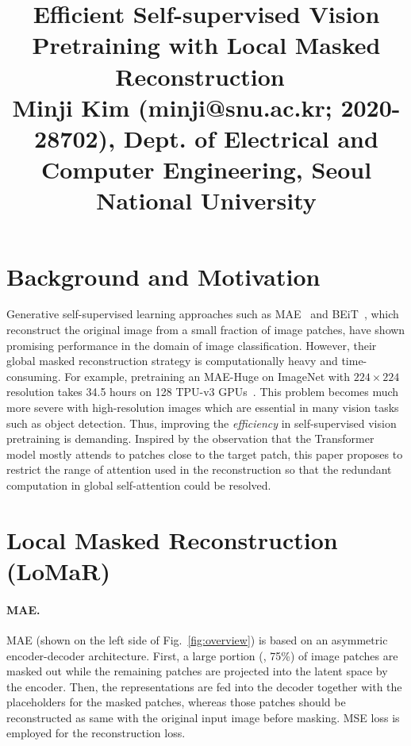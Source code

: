 \documentclass[10pt,twocolumn,letterpaper]{article}
\begin{document}
\title{Efficient Self-supervised Vision Pretraining with Local Masked Reconstruction~\cite{lomar} \\ {\rm {\normalsize Minji Kim (minji@snu.ac.kr; 2020-28702), Dept. of Electrical and Computer Engineering, Seoul National University}}}   %

\maketitle
\thispagestyle{empty}


\section{Background and Motivation}
Generative self-supervised learning approaches such as MAE~\cite{mae} and BEiT~\cite{beit}, which reconstruct the original image from a small fraction of image patches, have shown promising performance in the domain of image classification.
However, their global masked reconstruction strategy is computationally heavy and time-consuming.
For example, pretraining an MAE-Huge on ImageNet with $224 \times 224$ resolution takes 34.5 hours on 128 TPU-v3 GPUs~\cite{mae}.
This problem becomes much more severe with high-resolution images which are essential in many vision tasks such as object detection.
Thus, improving the \textit{efficiency} in self-supervised vision pretraining is demanding.
Inspired by the observation that the Transformer model mostly attends to patches close to the target patch, this paper proposes to restrict the range of attention used in the reconstruction so that the redundant computation in global self-attention could be resolved.


\section{Local Masked Reconstruction (LoMaR)}

\paragraph{MAE.}
MAE (shown on the left side of Fig.~\ref{fig:overview}) is based on an asymmetric encoder-decoder architecture.
First, a large portion (\eg, 75\%) of image patches are masked out while the remaining patches are projected into the latent space by the encoder.
Then, the representations are fed into the decoder together with the placeholders for the masked patches, whereas those patches should be reconstructed as same with the original input image before masking.
MSE loss is employed for the reconstruction loss.
\end{document}
